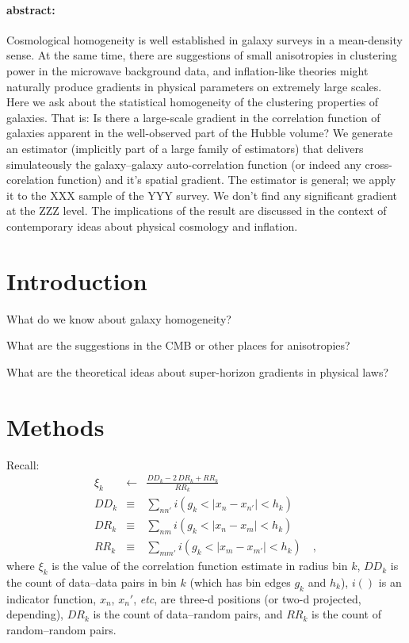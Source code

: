 \documentclass[12pt, letterpaper]{article}
\newcommand{\foreign}[1]{\textsl{#1}}
\newcommand{\etc}{\foreign{etc}}
\begin{document}
\paragraph{abstract:}
Cosmological homogeneity is well established in galaxy surveys in a mean-density
sense.
At the same time, there are suggestions of small anisotropies in clustering power in
the microwave background data, and inflation-like theories might naturally produce
gradients in physical parameters on extremely large scales.
Here we ask about the statistical homogeneity of the clustering properties of galaxies.
That is: Is there a large-scale gradient in the correlation function of galaxies
apparent in the well-observed part of the Hubble volume?
We generate an estimator (implicitly part of a large family of estimators)
that delivers simulateously the galaxy--galaxy auto-correlation function
(or indeed any cross-corelation function)
and it's spatial gradient.
The estimator is general; we apply it to the XXX sample of the YYY survey.
We don't find any significant gradient at the ZZZ level.
The implications of the result are discussed in the context of contemporary ideas
about physical cosmology and inflation.

\section{Introduction}

What do we know about galaxy homogeneity?

What are the suggestions in the CMB or other places for anisotropies?

What are the theoretical ideas about super-horizon gradients in physical laws?

\section{Methods}

Recall:
\begin{eqnarray}\displaystyle
\xi_k &\leftarrow& \frac{DD_k - 2\,DR_k + RR_k}{RR_k}
\\
DD_k &\equiv& \sum_{n n'} i(g_k < |x_n - x_{n'}| < h_k)
\\
DR_k &\equiv& \sum_{n m} i(g_k < |x_n - x_m| < h_k)
\\
RR_k &\equiv& \sum_{m m'} i(g_k < |x_m - x_{m'}| < h_k)
\quad ,
\end{eqnarray}
where
$\xi_k$ is the value of the correlation function estimate in radius bin $k$,
$DD_k$ is the count of data--data pairs in bin $k$
(which has bin edges $g_k$ and $h_k$),
$i()$ is an indicator function,
$x_n$, $x_n'$, \etc, are three-d positions (or two-d projected, depending),
$DR_k$ is the count of data--random pairs,
and
$RR_k$ is the count of random--random pairs.
\end{document}
